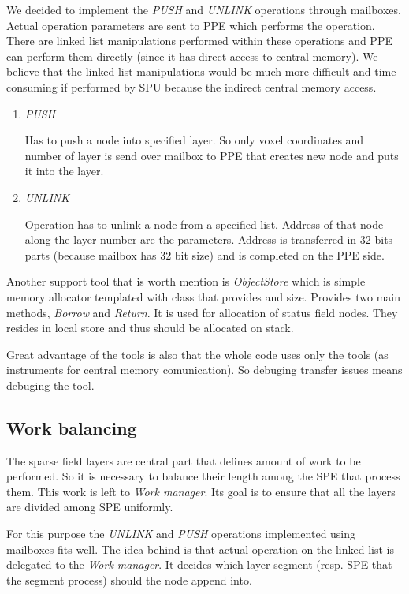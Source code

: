 \par
We decided to implement the \emph{PUSH} and \emph{UNLINK} operations through mailboxes.
Actual operation parameters are sent to PPE which performs the operation.
There are linked list manipulations performed within these operations and PPE can perform them directly (since it has direct access to central memory).
We believe that the linked list manipulations would be much more difficult and time consuming if performed by SPU because the indirect central memory access.

\begin{enumerate}
\item \emph{PUSH}
\par
Has to push a node into specified layer.
So only voxel coordinates and number of layer is send over mailbox to PPE that creates new node and puts it into the layer.

\item \emph{UNLINK}
\par
Operation has to unlink a node from a specified list.
Address of that node along the layer number are the parameters.
Address is transferred in 32 bits parts (because mailbox has 32 bit size) and is completed on the PPE side.
\end{enumerate}

Another support tool that is worth mention is \emph{ObjectStore} which is simple memory allocator templated with class that provides and size.
Provides two main methods, \emph{Borrow} and \emph{Return}.
It is used for allocation of status field nodes.
They resides in local store and thus should be allocated on stack.

Great advantage of the tools is also that the whole code uses only the tools (as instruments for central memory comunication).
So debuging transfer issues means debuging the tool.

\subsection{Work balancing}

The sparse field layers are central part that defines amount of work to be performed.
So it is necessary to balance their length among the SPE that process them.
This work is left to \emph{Work manager}.
Its goal is to ensure that all the layers are divided among SPE uniformly.

For this purpose the \emph{UNLINK} and \emph{PUSH} operations implemented using mailboxes fits well.
The idea behind is that actual operation on the linked list is delegated to the \emph{Work manager}.
It decides which layer segment (resp. SPE that the segment process) should the node append into.

